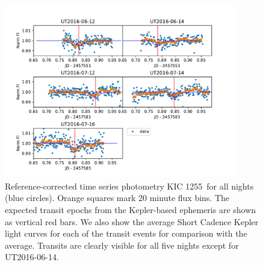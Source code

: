 \documentclass[preprint]{aastex61}
\newcommand{\shStar}{KIC 1255}
\begin{document}
\begin{figure}
\begin{centering}
\includegraphics[width=0.9\textwidth]{images/all_kic1255_phot/all_kic1255_refcor.pdf}
\caption{Reference-corrected time series photometry \shStar\ for all nights (blue circles).
Orange squares mark 20 minute flux bins.
The expected transit epochs from the Kepler-based ephemeris \citep{vanWerkhoven2014} are shown as vertical red bars.
We also show the average Short Cadence Kepler light curves for each of the transit events for comparison with the average.
Transits are clearly visible for all five nights except for UT2016-06-14.}\label{fig:allNightrefCorrect}
\end{centering}
\end{figure}


\clearpage
\end{document}
